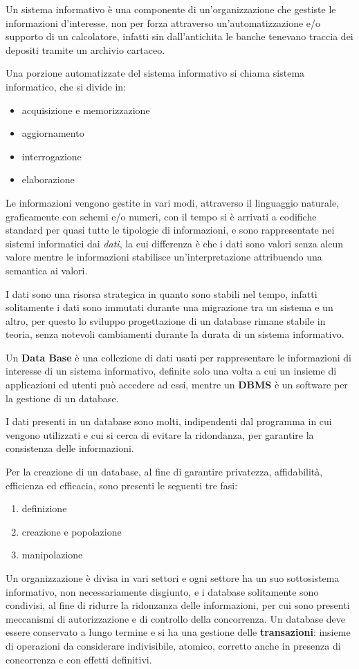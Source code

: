 \documentclass[a4paper,12pt, oneside]{book}
\begin{document}
Un sistema informativo è una componente di un'organizzazione che gestiste le informazioni d'interesse, non per forza attraverso
un'automatizzazione e/o supporto di un calcolatore, infatti sin dall'antichita le banche 
tenevano traccia dei depositi tramite un archivio cartaceo.

Una porzione automatizzate del sistema informativo si chiama sistema informatico, che si divide in:
\begin{itemize}
    \item acquisizione e memorizzazione
    \item aggiornamento
    \item interrogazione
    \item elaborazione
\end{itemize}
Le informazioni vengono gestite in vari modi, attraverso il linguaggio naturale, graficamente con schemi e/o numeri, 
con il tempo si è arrivati a codifiche standard per quasi tutte le tipologie di informazioni, e sono rappresentate 
nei sistemi informatici dai \emph{dati}, la cui differenza è che i dati sono valori senza alcun valore 
mentre le informazioni stabilisce un'interpretazione attribuendo una semantica ai valori. 

I dati sono una risorsa strategica in quanto sono stabili nel tempo, infatti solitamente i dati sono immutati
durante una migrazione tra un sistema e un altro, per questo lo sviluppo progettazione di un database rimane stabile in teoria,
senza notevoli cambiamenti durante la durata di un sistema informativo.

Un \textbf{Data Base} è una collezione di dati usati per rappresentare le informazioni di interesse di un sistema informativo,
definite solo una volta a cui un insieme di applicazioni ed utenti può accedere ad essi, 
mentre un \textbf{DBMS} è un software per la gestione di un database.

I dati presenti in un database sono molti, indipendenti dal programma in cui vengono utilizzati e cui si cerca di evitare 
la ridondanza, per garantire la consistenza delle informazioni.

Per la creazione di un database, al fine di garantire privatezza, affidabilità, efficienza ed efficacia,
sono presenti le seguenti tre fasi:
\begin{enumerate}
    \item definizione
    \item creazione e popolazione
    \item manipolazione
\end{enumerate}
Un organizzazione è divisa in vari settori e ogni settore ha un suo sottosistema informativo, non necessariamente disgiunto,
e i database solitamente sono condivisi, al fine di ridurre la ridonzanza delle informazioni, per cui sono presenti
meccanismi di autorizzazione e di controllo della concorrenza.\newline
Un database deve essere conservato a lungo termine e si ha una gestione delle \textbf{transazioni}:
insieme di operazioni da considerare indivisibile, atomico, corretto anche in presenza di concorrenza e con effetti definitivi.
\end{document}
